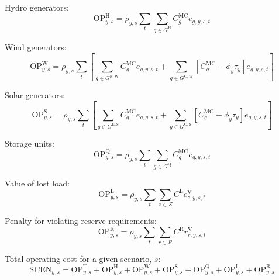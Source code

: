 \documentclass{article}
\newcommand{\sGeneratorsExistingWind}{G^{\mathrm{E,W}}}
\newcommand{\sGeneratorsExistingSolar}{G^{\mathrm{E,S}}}
\newcommand{\sGeneratorsCandidateWind}{G^{\mathrm{C,W}}}
\newcommand{\sGeneratorsCandidateSolar}{G^{\mathrm{C,S}}}
\newcommand{\sGeneratorsHydro}{G^{\mathrm{H}}}
\newcommand{\sStorage}{G^{\mathrm{Q}}}
\newcommand{\sZones}{Z}
\newcommand{\sRegions}{R}
\newcommand{\iGenerator}{g}
\newcommand{\iYear}{y}
\newcommand{\iScenario}{s}
\newcommand{\iInterval}{t}
\newcommand{\iZone}{z}
\newcommand{\iRegion}{r}
\newcommand{\cOperatingCostThermal}[1][\iYear,\iScenario]{\mathrm{OP}^{\mathrm{T}}_{#1}}
\newcommand{\cOperatingCostHydro}[1][\iYear,\iScenario]{\mathrm{OP}^{\mathrm{H}}_{#1}}
\newcommand{\cOperatingCostWind}[1][\iYear,\iScenario]{\mathrm{OP}^{\mathrm{W}}_{#1}}
\newcommand{\cOperatingCostSolar}[1][\iYear,\iScenario]{\mathrm{OP}^{\mathrm{S}}_{#1}}
\newcommand{\cOperatingCostStorage}[1][\iYear,\iScenario]{\mathrm{OP}^{\mathrm{Q}}_{#1}}
\newcommand{\cScenarioDuration}[1][\iYear,\iScenario]{\rho_{#1}}
\newcommand{\cMarginalCost}[1][\iGenerator,\iYear]{C^{\mathrm{MC}}_{#1}}
\newcommand{\cOperatingCostLostLoad}[1][\iYear,\iScenario]{\mathrm{OP}^{\mathrm{L}}_{#1}}
\newcommand{\cLostLoadCost}{C^{\mathrm{L}}}
\newcommand{\cReserveUpViolationPenalty}{C^{\mathrm{R}}}
\newcommand{\cOperatingCostReserveUpViolation}[1][\iYear,\iScenario]{\mathrm{OP}^{\mathrm{R}}_{#1}}
\newcommand{\cOperatingCostScenario}[1][\iYear,\iScenario]{\mathrm{SCEN}_{#1}}
\newcommand{\vBaseline}[1][\iYear]{\phi_{#1}}
\newcommand{\vPermitPrice}[1][\iYear]{\tau_{#1}}
\newcommand{\vEnergy}[1][\iGenerator,\iYear,\iScenario,\iInterval]{e_{#1}}
\newcommand{\vReserveUpViolation}[1][\iRegion,\iYear,\iScenario,\iInterval]{r^{\mathrm{V}}_{#1}}
\newcommand{\vLostLoadEnergy}[1][\iZone,\iYear,\iScenario,\iInterval]{e^{\mathrm{V}}_{#1}}
\begin{document}
Hydro generators:
\begin{equation}
	\cOperatingCostHydro = \cScenarioDuration\sum\limits_{\iInterval}\sum\limits_{\iGenerator \in \sGeneratorsHydro}\cMarginalCost[\iGenerator] \vEnergy
\end{equation}

Wind generators:
\begin{equation}
	\cOperatingCostWind = \cScenarioDuration\sum\limits_{\iInterval}\left[\sum\limits_{\iGenerator \in \sGeneratorsExistingWind} \cMarginalCost[\iGenerator] \vEnergy + \sum\limits_{\iGenerator \in \sGeneratorsCandidateWind} \left[\cMarginalCost[\iGenerator] - \vBaseline \vPermitPrice\right] \vEnergy\right]
\end{equation}

Solar generators:
\begin{equation}
	\cOperatingCostSolar = \cScenarioDuration \sum\limits_{\iInterval}\left[\sum\limits_{\iGenerator \in \sGeneratorsExistingSolar} \cMarginalCost[\iGenerator] \vEnergy + \sum\limits_{\iGenerator \in \sGeneratorsCandidateSolar} \left[\cMarginalCost[\iGenerator] - \vBaseline\vPermitPrice\right] \vEnergy\right]
\end{equation}

Storage units:
\begin{equation}
	\cOperatingCostStorage = \cScenarioDuration\sum\limits_{\iInterval}\sum\limits_{\iGenerator \in \sStorage} \cMarginalCost[\iGenerator] \vEnergy
\end{equation}

Value of lost load:
\begin{equation}
	\cOperatingCostLostLoad = \cScenarioDuration\sum\limits_{\iInterval}\sum\limits_{\iZone \in \sZones} \cLostLoadCost \vLostLoadEnergy
\end{equation}

Penalty for violating reserve requirements:
\begin{equation}
	\cOperatingCostReserveUpViolation = \cScenarioDuration\sum\limits_{\iInterval}\sum\limits_{\iRegion \in \sRegions} \cReserveUpViolationPenalty \vReserveUpViolation
\end{equation}

Total operating cost for a given scenario, $\iScenario$:
\begin{equation}
	\cOperatingCostScenario = \cOperatingCostThermal + \cOperatingCostHydro + \cOperatingCostWind + \cOperatingCostSolar + \cOperatingCostStorage + \cOperatingCostLostLoad + \cOperatingCostReserveUpViolation
\end{equation}
\end{document}
